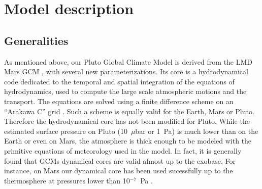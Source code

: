 \section{Model description}
\label{sc:model}
\label{sc:physi}

\subsection{Generalities}

\label{sc:dynam}
\label{sc:dynamic}

As mentioned above, our Pluto Global Climate Model is derived from the LMD Mars GCM 
\cite[]{Forg:99} , with several new parameterizations.
Its core is a hydrodynamical code dedicated to the temporal and spatial integration of the
equations of hydrodynamics, used to compute the large scale atmospheric motions and the
transport.  The equations are solved using a finite difference scheme on an ``Arakawa C'' grid
\cite[]{Arak:77}.
Such a scheme is equally valid for the Earth, Mars or Pluto. Therefore the hydrodynamical
core
 has not been
modified for Pluto.  While the estimated surface pressure on Pluto (10~$\mu$bar or 1~Pa)
is much lower than on the Earth or even on Mars, the atmosphere is thick
enough to be modeled with the primitive equations of meteorology used in the
model. In fact, it is generally found that GCMs dynamical cores are valid almost up to the
exobase.
For instance, on Mars our dynamical core has been used sucessfully up to
the thermosphere at pressures lower than 10$^{-7}$~Pa
\cite[]{Gonz:09a}.

